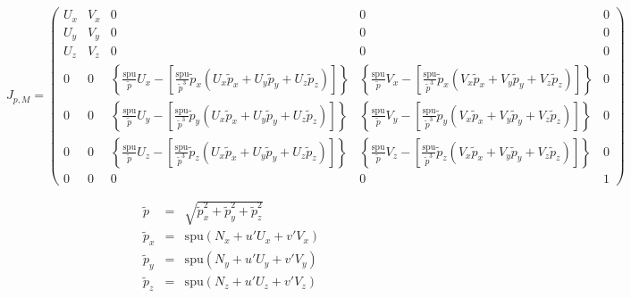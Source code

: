 \documentclass{article}
\begin{document}
$J_{p,M}=\left(\begin{array}{cccccc}U_{x} & V_{x} & 0 & 0 & 0\\U_{y} & V_{y} & 0 & 0 & 0\\U_{z} & V_{z} & 0 & 0 & 0\\0 & 0 & \left\{ \frac{\textrm{spu}}{\widetilde{p}}U_{x}-\left[\frac{\textrm{spu}}{\widetilde{p}^{3}}\widetilde{p}_{x}\left(U_{x}\widetilde{p}_{x}+U_{y}\widetilde{p}_{y}+U_{z}\widetilde{p}_{z}\right)\right]\right\} & \left\{ \frac{\textrm{spu}}{\widetilde{p}}V_{x}-\left[\frac{\textrm{spu}}{\widetilde{p}^{3}}\widetilde{p}_{x}\left(V_{x}\widetilde{p}_{x}+V_{y}\widetilde{p}_{y}+V_{z}\widetilde{p}_{z}\right)\right]\right\} & 0\\0 & 0 & \left\{ \frac{\textrm{spu}}{\widetilde{p}}U_{y}-\left[\frac{\textrm{spu}}{\widetilde{p}^{3}}\widetilde{p}_{y}\left(U_{x}\widetilde{p}_{x}+U_{y}\widetilde{p}_{y}+U_{z}\widetilde{p}_{z}\right)\right]\right\} & \left\{ \frac{\textrm{spu}}{\widetilde{p}}V_{y}-\left[\frac{\textrm{spu}}{\widetilde{p}^{3}}\widetilde{p}_{y}\left(V_{x}\widetilde{p}_{x}+V_{y}\widetilde{p}_{y}+V_{z}\widetilde{p}_{z}\right)\right]\right\} & 0\\0 & 0 & \left\{ \frac{\textrm{spu}}{\widetilde{p}}U_{z}-\left[\frac{\textrm{spu}}{\widetilde{p}^{3}}\widetilde{p}_{z}\left(U_{x}\widetilde{p}_{x}+U_{y}\widetilde{p}_{y}+U_{z}\widetilde{p}_{z}\right)\right]\right\} & \left\{ \frac{\textrm{spu}}{\widetilde{p}}V_{z}-\left[\frac{\textrm{spu}}{\widetilde{p}^{3}}\widetilde{p}_{z}\left(V_{x}\widetilde{p}_{x}+V_{y}\widetilde{p}_{y}+V_{z}\widetilde{p}_{z}\right)\right]\right\} & 0\\0 & 0 & 0 & 0 & 1\end{array}\right)$
\pagebreak

\begin{eqnarray*}\widetilde{p} & = & \sqrt{\widetilde{p}_{x}^{2}+\widetilde{p}_{y}^{2}+\widetilde{p}_{z}^{2}}\\\widetilde{p}_{x} & = & \textrm{spu}\left(N_{x}+u\prime U_{x}+v\prime V_{x}\right)\\\widetilde{p}_{y} & = & \textrm{spu}\left(N_{y}+u\prime U_{y}+v\prime V_{y}\right)\\\widetilde{p}_{z} & = & \textrm{spu}\left(N_{z}+u\prime U_{z}+v\prime V_{z}\right)\end{eqnarray*}
\pagebreak
\end{document}

